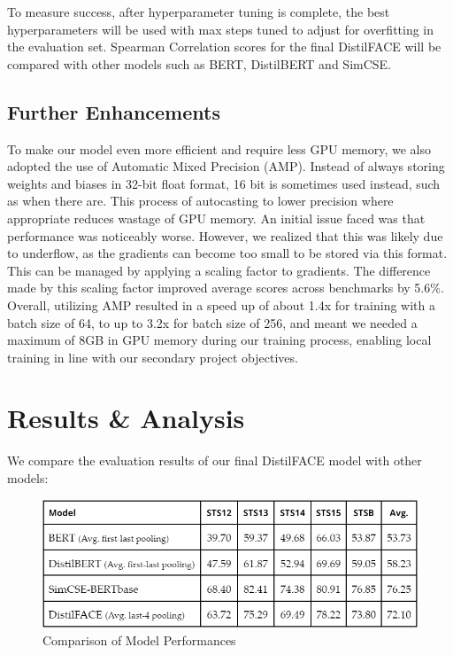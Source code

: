 \documentclass[10pt,twocolumn,letterpaper]{article}
\begin{document}
To measure success, after hyperparameter tuning is complete, the best hyperparameters will be used with max steps tuned to adjust for overfitting in the evaluation set. Spearman Correlation scores for the final DistilFACE will be compared with other models such as BERT, DistilBERT and SimCSE. 

\subsection{Further Enhancements}

To make our model even more efficient and require less GPU memory, we also adopted the use of Automatic Mixed Precision (AMP). Instead of always storing weights and biases in 32-bit float format, 16 bit is sometimes used instead, such as when there are. This process of autocasting to lower precision where appropriate reduces wastage of GPU memory. An initial issue faced was that performance was noticeably worse. However, we realized that this was likely due to underflow, as the gradients can become too small to be stored via this format. This can be managed by applying a scaling factor to gradients. The difference made by this scaling factor improved average scores across benchmarks by 5.6\%. Overall, utilizing AMP resulted in a speed up of about 1.4x for training with a batch size of 64, to up to 3.2x for batch size of 256, and meant we needed a maximum of 8GB in GPU memory during our training process, enabling local training in line with our secondary project objectives.


\section{Results \& Analysis}

We compare the evaluation results of our final DistilFACE model with other models:

\begin{figure}[hbt!]
\centering
\includegraphics[scale=0.4]{images/Results-Compare-Models.png}
\caption{Comparison of Model Performances}
\label{fig:short}
\end{figure}
\end{document}
